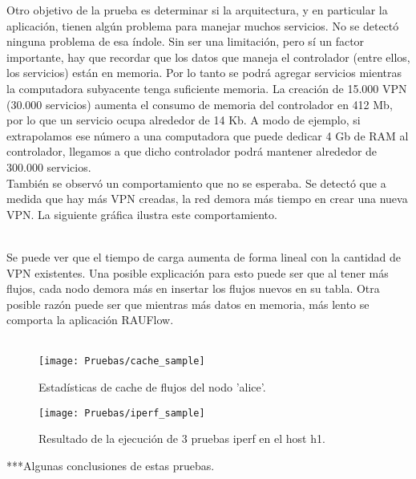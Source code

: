 Otro objetivo de la prueba es determinar si la arquitectura, y en particular la aplicación, tienen algún problema para manejar muchos servicios. No se detectó ninguna problema de esa índole. Sin ser una limitación, pero sí un factor importante, hay que recordar que los datos que maneja el controlador (entre ellos, los servicios) están en memoria. Por lo tanto se podrá agregar servicios mientras la computadora subyacente tenga suficiente memoria. La creación de 15.000 VPN (30.000 servicios) aumenta el consumo de memoria del controlador en 412 Mb, por lo que un servicio ocupa alrededor de 14 Kb. A modo de ejemplo, si extrapolamos ese número a una computadora que puede dedicar 4 Gb de RAM al controlador, llegamos a que dicho controlador podrá mantener alrededor de 300.000 servicios. \\

También se observó un comportamiento que no se esperaba. Se detectó que a medida que hay más VPN creadas, la red demora más tiempo en crear una nueva VPN. La siguiente gráfica ilustra este comportamiento. \\ \\
Se puede ver que el tiempo de carga aumenta de forma lineal con la cantidad de VPN existentes. Una posible explicación para esto puede ser que al tener más flujos, cada nodo demora más en insertar los flujos nuevos en su tabla. Otra posible razón puede ser que mientras más datos en memoria, más lento se comporta la aplicación RAUFlow. \\ \\

\begin{figure}[t]
	\caption{Estadísticas de cache de flujos del nodo 'alice'.}
	\texttt{[image: Pruebas/cache\_sample]}
	\centering
	\label{fig:cache_sample}
\end{figure}

\begin{figure}[t]
	\caption{Resultado de la ejecución de 3 pruebas iperf en el host h1.}
	\texttt{[image: Pruebas/iperf\_sample]}
	\centering
	\label{fig:iperf_sample}
\end{figure}

***Algunas conclusiones de estas pruebas.